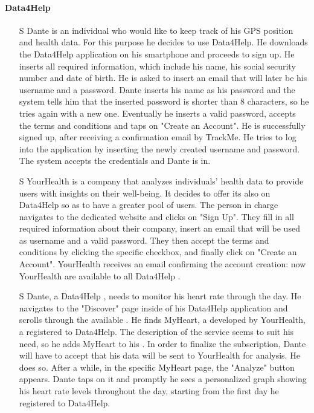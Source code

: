 \documentclass[../../rasd.tex]{subfiles}
\begin{document}
        \paragraph{Data4Help}
        \begin{itemize}

                    \item[S\subs{1}] Dante is an individual who would like to keep track of his GPS position and health data. For this purpose he decides to use Data4Help. He downloads the Data4Help application on his smartphone and proceeds to sign up. He inserts all required information, which include his name, his social security number and date of birth. He is asked to insert an email that will later be his username and a password. Dante inserts his name as his password and the system tells him that the inserted password is shorter than 8 characters, so he tries again with a new one. Eventually he inserts a valid password, accepts the terms and conditions and taps on "Create an Account". He is successfully signed up, after receiving a confirmation email by TrackMe. He tries to log into the application by inserting the newly created username and password. The system accepts the credentials and Dante is in.
                    
                    \item[S\subs{2}] YourHealth is a company that analyzes individuals' health data to provide users with insights on their well-being. It decides to offer its  also on Data4Help so as to have a greater pool of users. The person in charge navigates to the  dedicated website and clicks on "Sign Up". They fill in all required information about their company, insert an email that will be used as username and a valid password. They then accept the terms and conditions by clicking the specific checkbox, and finally click on "Create an Account". YourHealth receives an email confirming the account creation: now YourHealth  are available to all Data4Help .
                    
                    \item[S\subs{3}] Dante, a Data4Help , needs to monitor his heart rate through the day. He navigates to the "Discover" page inside of his Data4Help application and scrolls through the available . He finds MyHeart, a  developed by YourHealth, a  registered to Data4Help. The description of the service seems to suit his need, so he adds MyHeart to his . In order to finalize the subscription, Dante will have to accept that his data will be sent to YourHealth for analysis. He does so. After a while, in the specific MyHeart  page, the "Analyze" button appears. Dante taps on it and promptly he sees a personalized graph showing his heart rate levels throughout the day, starting from the first day he registered to Data4Help.


\end{itemize}
\end{document}
